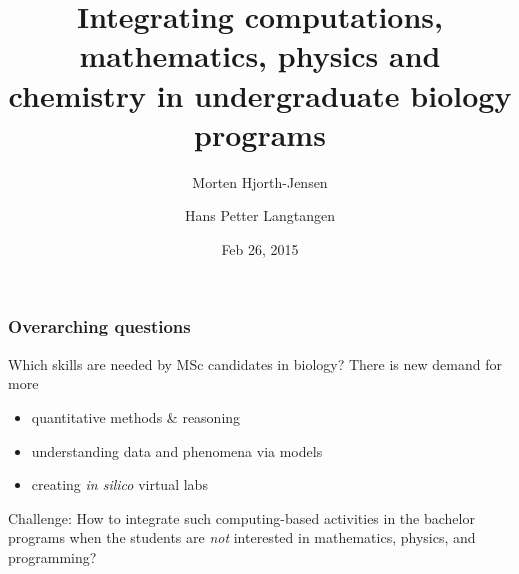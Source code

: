 \documentclass{beamer}
\begin{document}




\title{Integrating computations, mathematics, physics and chemistry in undergraduate biology programs}


\author{Morten Hjorth-Jensen
\and
Hans Petter Langtangen}

\date{Feb 26, 2015
}

\begin{frame}
\titlepage
\end{frame}

\begin{frame}
\frametitle{Overarching questions}

\pause
\begin{block}{Which skills are needed by MSc candidates in biology? }
There is new demand for more

\begin{itemize}
  \item quantitative methods {\&} reasoning

  \item understanding data and phenomena via models

  \item creating \emph{in silico} virtual labs
\end{itemize}

\noindent
\end{block}

\pause
\begin{block}{Challenge: }
How to integrate such computing-based activities in the bachelor programs
when the students are \emph{not} interested in mathematics, physics, and
programming?
\end{block}
\end{frame}
\end{document}
